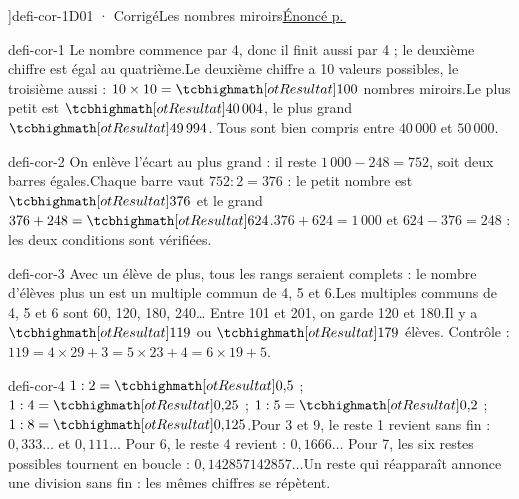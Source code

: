 \editionPage[\pdfbookmark[0]{Corrigés des défis}{bm-defi-cor-1-parent}]{defi-cor-1}{D01 · Corrigé}{Les nombres miroirs}{\hyperref[defi-ex-1]{Énoncé p.\,\pageref*{defi-ex-1}}}
\begin{blocEdition}{defi-cor-1}
Le nombre commence par 4, donc il finit aussi par 4 ; le deuxième chiffre est égal au quatrième.Le deuxième chiffre a 10 valeurs possibles, le troisième aussi : $10\times10=\res{100}$ nombres miroirs.Le plus petit est $\res{40\,004}$, le plus grand $\res{49\,994}$. Tous sont bien compris entre $40\,000$ et $50\,000$.
\end{blocEdition}
\begin{blocEdition}{defi-cor-2}
On enlève l’écart au plus grand : il reste $1\,000-248=752$, soit deux barres égales.Chaque barre vaut $752:2=376$ : le petit nombre est $\res{376}$ et le grand $376+248=\res{624}$.$376+624=1\,000$ et $624-376=248$ : les deux conditions sont vérifiées.
\end{blocEdition}
\begin{blocEdition}{defi-cor-3}
Avec un élève de plus, tous les rangs seraient complets : le nombre d’élèves plus un est un multiple commun de 4, 5 et 6.Les multiples communs de 4, 5 et 6 sont 60, 120, 180, 240… Entre 101 et 201, on garde 120 et 180.Il y a $\res{119}$ ou $\res{179}$ élèves. Contrôle : $119=4\times29+3=5\times23+4=6\times19+5$.
\end{blocEdition}
\begin{blocEdition}{defi-cor-4}
$1:2=\res{0{,}5}$ ; $1:4=\res{0{,}25}$ ; $1:5=\res{0{,}2}$ ; $1:8=\res{0{,}125}$.Pour 3 et 9, le reste 1 revient sans fin : $0{,}333\ldots$ et $0{,}111\ldots$ Pour 6, le reste 4 revient : $0{,}1666\ldots$ Pour 7, les six restes possibles tournent en boucle : $0{,}142857142857\ldots$Un reste qui réapparaît annonce une division sans fin : les mêmes chiffres se répètent.
\end{blocEdition}
